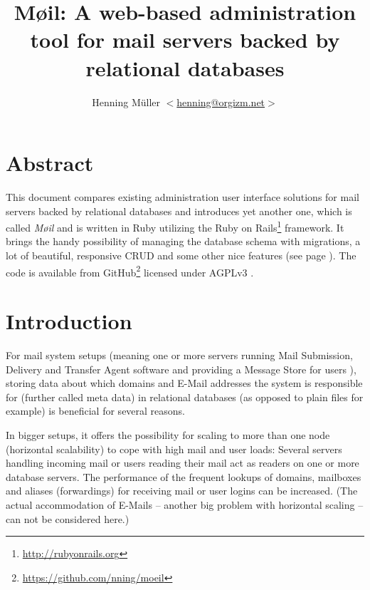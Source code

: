 \documentclass[12pt,a4paper]{scrartcl}
\begin{document}
	\title{Møil: A web-based administration tool for mail servers backed by relational databases}
	\author{Henning Müller $<$\href{mailto:henning@orgizm.net}{henning@orgizm.net}$>$}
	\date{}

	\maketitle


	\section*{Abstract}
		This document compares existing administration user interface solutions
		for mail servers backed by relational databases and introduces yet
		another one, which is called \emph{Møil} and is written in Ruby
		utilizing the Ruby on Rails\footnote{\url{http://rubyonrails.org}}
		framework. It brings the handy possibility of managing the database
		schema with migrations, a lot of beautiful, responsive \ac{CRUD} and
		some other nice features (see page \pageref{sec:moeil:features}). The
		code is available from
		GitHub\footnote{\url{https://github.com/nning/moeil}} licensed under
		AGPLv3 \cite{agpl}.

	\section*{Introduction}

		For mail system setups (meaning one or more servers running Mail
		Submission, Delivery and Transfer Agent software and providing a
		Message Store for users \cite{mail-architecture}), storing data about
		which domains and E-Mail addresses the system is responsible for
		(further called meta data) in relational databases (as opposed to plain
		files for example) is beneficial for several reasons.


		In bigger setups, it offers the possibility for scaling to more than
		one node (horizontal scalability) to cope with high mail and user
		loads: Several servers handling incoming mail or users reading their
		mail act as readers on one or more database servers. The performance of
		the frequent lookups of domains, mailboxes and aliases (forwardings)
		for receiving mail or user logins can be increased. (The actual
		accommodation of E-Mails -- another big problem with horizontal scaling
		-- can not be considered here.)
\end{document}
